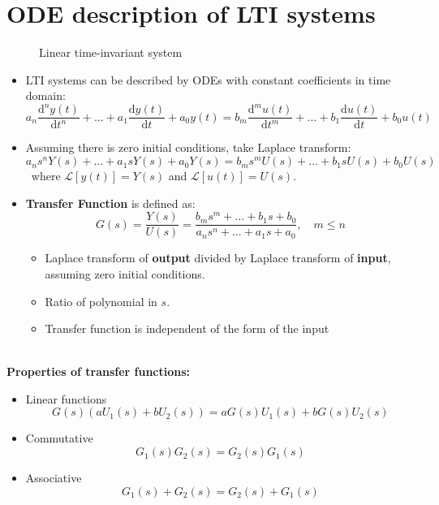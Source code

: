 \section{ODE description of LTI systems}
    \begin{figure}[H] 
        \centering
        
        \caption{Linear time-invariant system}
    \end{figure}
    
\begin{itemize}
    \item LTI systems can be described by ODEs with constant coefficients in time domain:
        \[ a_{n} \frac{\mathrm{d}^{n}y(t)}{\mathrm{d}t^{n}}+...+a_{1} \frac{\mathrm{d}y(t)}{\mathrm{d}t}+a_{0} y(t) = b_{m} \frac{\mathrm{d}^{m}u(t)}{\mathrm{d}t^{m}}+...+b_{1} \frac{\mathrm{d}u(t)}{\mathrm{d}t}+b_{0} u(t) \]

    \item Assuming there is zero initial conditions, take Laplace transform:
        \[ a_{n} s^{n} Y(s)+...+ a_{1} s Y(s) + a_{0} Y(s) = b_{m} s^{m} U(s)+...+b_{1} s U(s) + b_{0} U(s) \]
        \ where $\mathcal{L}[y(t)] = Y(s)$ and $\mathcal{L}[u(t)] = U(s)$. 

    \item \textbf{Transfer Function} is defined as:
        \[ \boxed{G(s)=\frac{Y(s)}{U(s)}=\frac{b_{m} s^{m}+...+b_{1} s +b_{0}}{a_{n} s^{n}+...+a_{1} s+a_{0}},\quad m \leq n }\] 
        
        \begin{itemize}
             \item Laplace transform of \textbf{output} divided by Laplace transform of \textbf{input}, assuming zero initial conditions.
             
             \item Ratio of polynomial in $s$.
             
             \item Transfer function is independent of the form of the input
        \end{itemize}
\end{itemize}
\ \\
\textbf{Properties of transfer functions:}
\begin{itemize}
    \item Linear functions
        \[ 
        G(s) (aU_{1}(s)+bU_{2}(s)) = aG(s)U_{1}(s)+b G(s) U_{2}(s)
        \]
    \item Commutative
        \[G_{1}(s) G_{2}(s) = G_{2}(s)G_{1}(s)\]
    \item Associative
        \[G_{1}(s) +G_{2}(s) = G_{2}(s) +G_{1}(s)\]
\end{itemize}

